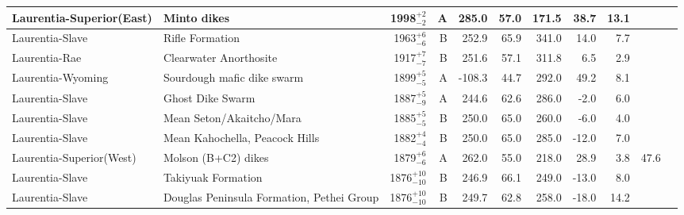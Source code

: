 \documentclass[twocolumn, switch]{article} %
\begin{document}
{\begin{landscape}
\begin{ThreePartTable}
\begin{longtable}{p{1.4 in}p{1.2 in}rrrrrrrrp{1.2 in}}
      Laurentia-Superior(East) &                                        Minto dikes &     1998$^{+2}_{-2}$ &      A &     285.0 &      57.0 & 171.5 &  38.7 &      13.1 &          &                                  \cite{Evans2010a} \\ \hline
               Laurentia-Slave &                                    Rifle Formation &     1963$^{+6}_{-6}$ &      B &     252.9 &      65.9 & 341.0 &  14.0 &       7.7 &          &                                  \cite{Evans1981a} \\ \hline
                 Laurentia-Rae &                             Clearwater Anorthosite &     1917$^{+7}_{-7}$ &      B &     251.6 &      57.1 & 311.8 &   6.5 &       2.9 &          &                                  \cite{Halls1999a} \\ \hline
             Laurentia-Wyoming &                         Sourdough mafic dike swarm &     1899$^{+5}_{-5}$ &      A &    -108.3 &      44.7 & 292.0 &  49.2 &       8.1 &          &                                 \cite{Kilian2016b} \\ \hline
               Laurentia-Slave &                                   Ghost Dike Swarm &     1887$^{+5}_{-9}$ &      A &     244.6 &      62.6 & 286.0 &  -2.0 &       6.0 &          &                                 \cite{Buchan2016a} \\ \hline
               Laurentia-Slave &                           Mean Seton/Akaitcho/Mara &     1885$^{+5}_{-5}$ &      B &     250.0 &      65.0 & 260.0 &  -6.0 &       4.0 &          &                               \cite{Mitchell2010c} \\ \hline
               Laurentia-Slave &                     Mean Kahochella, Peacock Hills &     1882$^{+4}_{-4}$ &      B &     250.0 &      65.0 & 285.0 & -12.0 &       7.0 &          &                               \cite{Mitchell2010c} \\ \hline
      Laurentia-Superior(West) &                                Molson (B+C2) dikes &     1879$^{+6}_{-6}$ &      A &     262.0 &      55.0 & 218.0 &  28.9 &       3.8 &        47.6 &                                  \cite{Evans2010a} \\ \hline
               Laurentia-Slave &                                 Takiyuak Formation &   1876$^{+10}_{-10}$ &      B &     246.9 &      66.1 & 249.0 & -13.0 &       8.0 &          &                                 \cite{Irving1979a} \\ \hline
               Laurentia-Slave &          Douglas Peninsula Formation, Pethei Group &   1876$^{+10}_{-10}$ &      B &     249.7 &      62.8 & 258.0 & -18.0 &      14.2 &          &                                 \cite{Irving1979a} \\ \hline

\end{longtable}
\end{ThreePartTable}
\end{landscape}}
\end{document}
